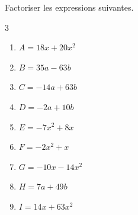 {%
\begin{Exercice}%
Factoriser les expressions suivantes.
\begin{multicols}{3}
\begin{enumerate}[itemsep=1em,label={}]
	\item \begin{minipage}[t]{\linewidth}$A=18x+20x^2$\end{minipage}
	\item \begin{minipage}[t]{\linewidth}$B=35a-63b$\end{minipage}
	\item \begin{minipage}[t]{\linewidth}$C=-14a+63b$\end{minipage}
	\item \begin{minipage}[t]{\linewidth}$D=-2a+10b$\end{minipage}
	\item \begin{minipage}[t]{\linewidth}$E=-7x^2+8x$\end{minipage}
	\item \begin{minipage}[t]{\linewidth}$F=-2x^2+x$\end{minipage}
	\item \begin{minipage}[t]{\linewidth}$G=-10x-14x^2$\end{minipage}
	\item \begin{minipage}[t]{\linewidth}$H=7a+49b$\end{minipage}
	\item \begin{minipage}[t]{\linewidth}$I=14x+63x^2$\end{minipage}
\end{enumerate}
\end{multicols}
\end{Exercice}

}
